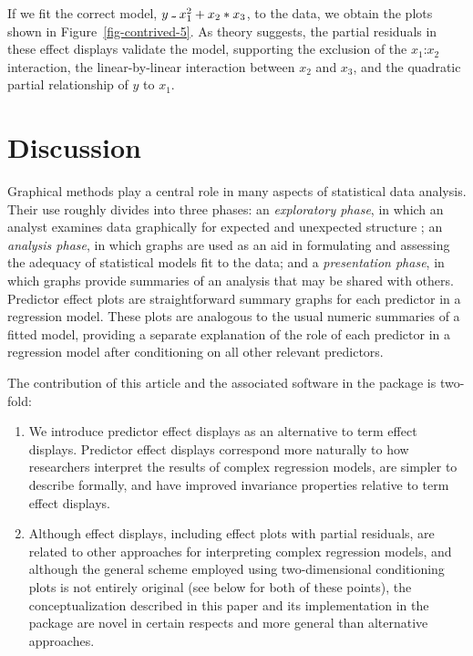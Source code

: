 \documentclass[article]{jss}
\newcommand{\tild}{\symbol{126}}
\newcommand{\Rtilde}{\,\raisebox{-.5ex}{\code{\tild{}}}\,}
\newcommand{\inter}[2]{\mbox{$#1$:$#2$}}
\begin{document}
If we fit the correct model, $y \Rtilde{} x_1^2 + x_2 * x_3$, to the
data, we obtain the plots shown in Figure~\ref{fig-contrived-5}. As
theory suggests, the partial residuals in these effect displays
validate the model, supporting the exclusion of the \inter{x_1}{x_2}
interaction, the linear-by-linear interaction between $x_2$ and $x_3$,
and the quadratic partial relationship of $y$ to $x_1$.

\section{Discussion}\label{sec-discussion}

Graphical methods play a central role in many aspects of statistical
data analysis.  Their use roughly divides into three phases: an
\emph{exploratory phase}, in which an analyst examines data
graphically for expected and unexpected structure \citep{Tukey77}; an
\emph{analysis phase}, in which graphs are used as an aid in
formulating and assessing the adequacy of statistical models fit to
the data; and a \emph{presentation phase}, in which graphs provide
summaries of an analysis that may be shared with others.  Predictor
effect plots are straightforward summary graphs for each predictor in
a regression model.  These plots are analogous to the usual numeric
summaries of a fitted model, providing a separate explanation of the
role of each predictor in a regression model after conditioning on all
other relevant predictors.

The contribution of this article and the associated software in the  package is two-fold:
\begin{enumerate}

\item We introduce predictor effect displays as an alternative to term effect displays. Predictor effect displays correspond more naturally to how researchers interpret the results of complex regression models, are simpler to describe formally, and have improved invariance properties relative to term effect displays.

\item Although effect displays, including effect plots with partial residuals, are related to other approaches for interpreting complex regression models, and although the general scheme employed using two-dimensional conditioning plots is not entirely original (see below for both of these points), the conceptualization described in this paper and its implementation in the  package are novel in certain respects and more general than alternative approaches.

\end{enumerate}
\end{document}
